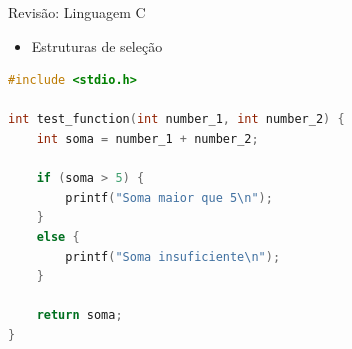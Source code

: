 \begin{frame}[fragile]{Revisão: Linguagem C}
    \begin{itemize}
        \item Estruturas de seleção
    \end{itemize}

\begin{lstlisting}[language=C,basicstyle=\ttfamily\scriptsize]
#include <stdio.h>

int test_function(int number_1, int number_2) {
    int soma = number_1 + number_2;

    if (soma > 5) {
        printf("Soma maior que 5\n");
    } 
    else {
        printf("Soma insuficiente\n");
    }

    return soma;
}
\end{lstlisting}

\end{frame}